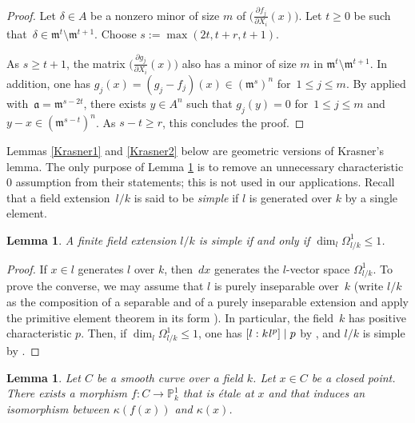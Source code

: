 \documentclass{amsart}
\newtheorem{lem}[thm]{Lemma}
\theoremstyle{definition}
\theoremstyle{remark}
\numberwithin{equation}{section}
\def\P{\mathbb P}
\def\km{\mathfrak{m}}
\def\ka{\mathfrak{a}}
\begin{document}
\begin{proof}
Let $\delta\in A$ be a nonzero minor of size $m$ of $\big(\frac{\partial f_j}{\partial X_i}(x)\big)$.
Let $t\geq 0$ be such that~${\delta\in \km^t\setminus\km^{t+1}}$. Choose $s:=\max(2t,t+r,t+1)$.

As $s\geq t+1$, the matrix $\big(\frac{\partial g_j}{\partial X_i}(x)\big)$ also has a minor of size $m$ in $\km^t\setminus\km^{t+1}$.
In addition, one has $g_j(x)=(g_j-f_j)(x)\in(\km^s)^n$ for~${1\leq j\leq m}$. 
By \cite[Lemma~5.10]{Artinapprox} applied with~${\ka=\km^{s-2t}}$, there exists $y\in A^n$ such that $g_j(y)=0$ for~$1\leq j\leq m$ and~$y-x\in (\km^{s-t})^n$. As $s-t\geq r$, this concludes the proof.
\end{proof}

Lemmas \ref{Krasner1} and \ref{Krasner2} below are geometric versions of Krasner's lemma. The only purpose of Lemma \ref{primitive} is to remove an unnecessary characteristic $0$ assumption from their statements; this is not used in our applications. Recall that a field extension~$l/k$ is said to be \textit{simple} if $l$ is generated over $k$ by a single element.

\begin{lem}
\label{primitive}
A finite field extension $l/k$ is simple if and only if $\dim_l\Omega^1_{l/k}\leq 1$.
\end{lem}

\begin{proof}
If $x\in l$ generates $l$ over $k$, then~$dx$ generates the $l$-vector space $\Omega^1_{l/k}$.
To prove the converse, we may assume that $l$ is purely inseparable over~$k$ (write $l/k$ as the composition of a separable and of a purely inseparable extension and apply the primitive element theorem in its form \cite[\S 6.10]{vdW}). In particular, the field~$k$ has positive characteristic $p$. Then, if $\dim_l\Omega^1_{l/k}\leq 1$, one has $[l:k\hspace{.05em}l^p]\mid p$ by \cite[Lemma~\href{https://stacks.math.columbia.edu/tag/07P2}{07P2}]{SP}, and $l/k$ is simple by \cite[Theorem 6]{BMacL}.
\end{proof}

\begin{lem}
\label{affineline}
Let $C$ be a smooth curve over a field $k$. Let $x\in C$ be a closed point. There exists a morphism $f:C\to \P^1_k$ that is \'etale at $x$ and that induces an isomorphism between $\kappa(f(x))$ and $\kappa(x)$.
\end{lem}
\end{document}
